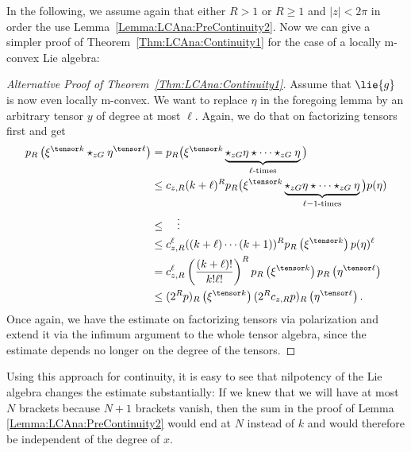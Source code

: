 In the following, we assume again that either $R > 1$ or $R \geq 1$
and $|z| < 2\pi$ in order the use
Lemma~\ref{Lemma:LCAna:PreContinuity2}. Now we can give a simpler proof of 
Theorem~\ref{Thm:LCAna:Continuity1} for the case of a locally m-convex 
Lie algebra:
\begin{proof}[Alternative Proof of Theorem~\ref{Thm:LCAna:Continuity1}]
    Assume that $\lie{g}$ is now even locally m-convex.  We want to
    replace $\eta$ in the foregoing lemma by an arbitrary tensor $y$
    of degree at most $\ell$. Again, we do that on factorizing tensors
    first and get
    \begin{align*}
        p_R \left(
        \xi^{\tensor k} \ostar_{zG} \eta^{\tensor \ell}
        \right)
        & =
        p_R \big(
        \xi^{\tensor k}
        \underbrace{\ostar_{zG} \eta \ostar \cdots \ostar_{zG} \eta}_{
        \ell \textrm{-times}}
        \big)
        \\
        & \leq
        c_{z,R} (k + \ell)^R
        p_R \big(
        \xi^{\tensor k}
        \underbrace{\ostar_{zG} \eta \ostar \cdots \ostar_{zG} \eta}_{
        \ell - 1 \textrm{-times}}
        \big)
        p(\eta)
        \\
        & \leq
        \quad \vdots
        \\
        & \leq
        c_{z,R}^{\ell} ((k + \ell) \cdots (k + 1))^R
        p_R \left( \xi^{\tensor k} \right)
        p(\eta)^{\ell}
        \\
        & =
        c_{z,R}^{\ell} \left(
        \frac{(k + \ell)!}{k! \ell!}
        \right)^R
        p_R \left( \xi^{\tensor k} \right)
        p_R \left( \eta^{\tensor \ell} \right)
        \\
        & \leq
        (2^R p)_R \left( \xi^{\tensor k} \right)
        (2^R c_{z,R} p)_R \left( \eta^{\tensor \ell} \right).
    \end{align*}
    Once again, we have the estimate on factorizing tensors via
    polarization and extend it via the infimum argument to the whole
    tensor algebra, since the estimate depends no longer on the degree
    of the tensors.
\end{proof}


Using this approach for continuity, it is easy to see that nilpotency
of the Lie algebra changes the estimate substantially: If we knew that
we will have at most $N$ brackets because $N + 1$ brackets vanish,
then the sum in the proof of Lemma \ref{Lemma:LCAna:PreContinuity2}
would end at $N$ instead of $k$ and would therefore be independent of
the degree of $x$.


